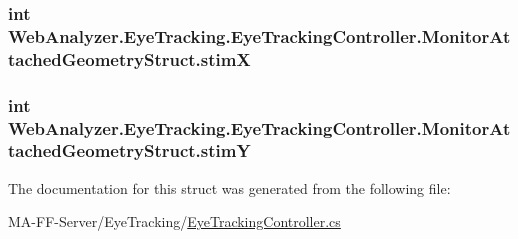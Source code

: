 \subsubsection[{stim\+X}]{\setlength{\rightskip}{0pt plus 5cm}int Web\+Analyzer.\+Eye\+Tracking.\+Eye\+Tracking\+Controller.\+Monitor\+Attached\+Geometry\+Struct.\+stim\+X}\label{struct_web_analyzer_1_1_eye_tracking_1_1_eye_tracking_controller_1_1_monitor_attached_geometry_struct_ad1f1c7a068c4900c1d03436441473b6e}
\hypertarget{struct_web_analyzer_1_1_eye_tracking_1_1_eye_tracking_controller_1_1_monitor_attached_geometry_struct_a0d4f9e13c008494155446587f41df63e}{}
\subsubsection[{stim\+Y}]{\setlength{\rightskip}{0pt plus 5cm}int Web\+Analyzer.\+Eye\+Tracking.\+Eye\+Tracking\+Controller.\+Monitor\+Attached\+Geometry\+Struct.\+stim\+Y}\label{struct_web_analyzer_1_1_eye_tracking_1_1_eye_tracking_controller_1_1_monitor_attached_geometry_struct_a0d4f9e13c008494155446587f41df63e}


The documentation for this struct was generated from the following file\+:\begin{DoxyCompactItemize}
\item 
M\+A-\/\+F\+F-\/\+Server/\+Eye\+Tracking/\hyperlink{_eye_tracking_controller_8cs}{Eye\+Tracking\+Controller.\+cs}\end{DoxyCompactItemize}

